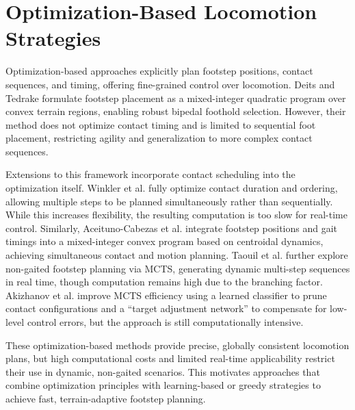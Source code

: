 \section{Optimization-Based Locomotion Strategies}
\label{sec:background-optimization-based-locomotion-strategies}

Optimization-based approaches explicitly plan footstep positions,
contact sequences, and timing, offering fine-grained control over
locomotion. Deits and Tedrake \cite{deits_footstep_2014} formulate
footstep placement as a mixed-integer quadratic program over convex
terrain regions, enabling robust bipedal foothold selection. However,
their method does not optimize contact timing and is limited to
sequential foot placement, restricting agility and generalization to
more complex contact sequences.

Extensions to this framework incorporate contact scheduling into the
optimization itself. Winkler et al. \cite{winkler_gait_2018} fully
optimize contact duration and ordering, allowing multiple steps to be
planned simultaneously rather than sequentially. While this increases
flexibility, the resulting computation is too slow for real-time
control. Similarly, Aceituno-Cabezas et al.
\cite{aceituno_simultaneous_2019} integrate footstep positions and
gait timings into a mixed-integer convex program based on centroidal
dynamics, achieving simultaneous contact and motion planning. Taouil
et al. \cite{taouil_non-gaited_2025} further explore non-gaited
footstep planning via MCTS, generating dynamic multi-step sequences
in real time, though computation remains high due to the branching
factor. Akizhanov et al.
\cite{akizhanov_learning_2024} improve MCTS efficiency using a
learned classifier to prune contact configurations and a “target
adjustment network” to compensate for low-level control errors, but
the approach is still computationally intensive.

These optimization-based methods provide precise, globally consistent
locomotion plans, but high computational costs and limited real-time
applicability restrict their use in dynamic, non-gaited scenarios.
This motivates approaches that combine optimization principles with
learning-based or greedy strategies to achieve fast, terrain-adaptive
footstep planning.

